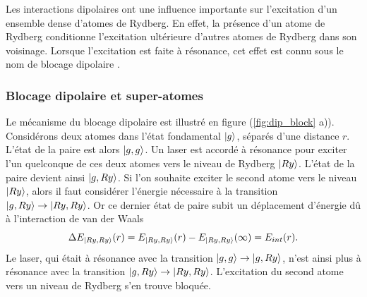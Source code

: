 \noindent Les interactions dipolaires ont une influence importante sur l'excitation d'un ensemble dense d'atomes de Rydberg.	
En effet, la présence d'un atome de Rydberg conditionne l'excitation ultérieure d'autres atomes de Rydberg dans son voisinage.
Lorsque l'excitation est faite à résonance, cet effet est connu sous le nom de \og blocage dipolaire \fg{}.

	\subsubsection*{Blocage dipolaire et super-atomes}
\noindent Le mécanisme du blocage dipolaire est illustré en figure (\ref{fig:dip_block} a)).
Considérons deux atomes dans l'état fondamental $\ket{g}$, séparés d'une distance $r$.
L'état de la paire est alors $\ket{g,g}$.
Un laser est accordé à résonance pour exciter l'un quelconque de ces deux atomes vers le niveau de Rydberg $\ket{Ry}$.
L'état de la paire devient ainsi $\ket{g,Ry}$.%
Si l'on souhaite exciter le second atome vers le niveau $\ket{Ry}$, alors il faut considérer l'énergie nécessaire à la transition $\ket{g,Ry} \rightarrow \ket{Ry,Ry}$.
Or ce dernier état de paire subit un déplacement d'énergie dû à l'interaction de van der Waals
%
\begin{equation}
\label{eq:DeltaE_block}
\Delta E_{\ket{Ry,Ry}}(r) = E_{\ket{Ry,Ry}}(r)-E_{\ket{Ry,Ry}}(\infty)
= E_{int}(r).
\end{equation}
%
Le laser, qui était à résonance avec la transition $\ket{g,g}\rightarrow\ket{g,Ry}$, n'est ainsi plus à résonance avec la transition $\ket{g,Ry}\rightarrow\ket{Ry,Ry}$.
L'excitation du second atome vers un niveau de Rydberg s'en trouve bloquée.


